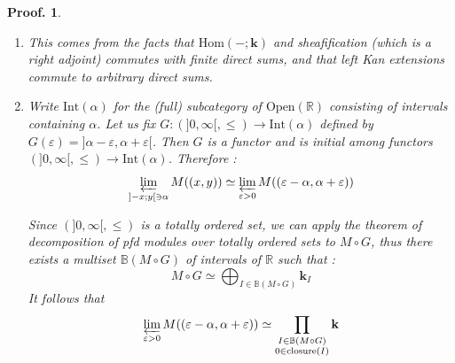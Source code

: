 \documentclass[a4paper, english, 11pt]{article}
\newcommand{\kk}[0]{\textbf{k}}
\newcommand{\0}{\vec{0}}
\newcommand{\R}[0]{\mathbb{R}}
\newcommand{\Ouv}[0]{\mathrm{Open}}
\newcommand{\Hom}[0]{\text{Hom}}
\newtheorem*{pf}{Proof.} }
\begin{document}
\begin{pf}
\begin{enumerate}
This proves the adjunction formula. The fact that the counit is given by~\eqref{eq:unitadjPetoSh} is 
a direct consequence of the proof and the proof of property (1).
    \item This comes from the facts that $\Hom(-;\kk)$ and sheafification (which is a right adjoint) commutes with finite direct sums, and that left Kan extensions commute to arbitrary direct sums.
    \item Write $\text{Int}(\alpha)$ for the (full) subcategory of $\Ouv(\R)$ consisting of intervals containing $\alpha$. Let us fix  $G :  (]0,\infty[,\leq)  \longrightarrow \text{Int}(\alpha)$ defined by 
  $G(\varepsilon) = ]\alpha - \varepsilon , \alpha + \varepsilon[  $. Then $G$ is a functor and is initial among functors $ (]0,\infty[,\leq)  \longrightarrow \text{Int}(\alpha)$. Therefore : 
     $$ \varprojlim_{]-x;y[\ni \alpha}M((x,y)) \simeq \varprojlim_{\varepsilon > 0}M((\varepsilon - \alpha  , \alpha + \varepsilon)) $$
     
     
     Since $(]0,\infty[,\leq) $ is a totally ordered set, we can apply the theorem of decomposition of pfd modules over totally ordered sets to $M\circ G$, thus there exists a multiset $\mathbb{B}(M\circ G)$ of intervals of $\R$ such that : 
     \begin{equation}\label{eq:DefMoG} M\circ G \simeq \bigoplus_{I\in \mathbb{B}(M\circ G)} \kk_I \end{equation}
    It follows that \begin{equation}\label{eq:porjlimM} \varprojlim_{\varepsilon > 0}M((\varepsilon - \alpha  , \alpha + \varepsilon)) \simeq \prod_{\substack{I\in \mathbb{B}(M\circ G)\\ 0 \in \text{closure}(I)}} \kk  \end{equation}
                                                                                                                                                                                                                  

\end{enumerate}
\end{pf}
\end{document}
